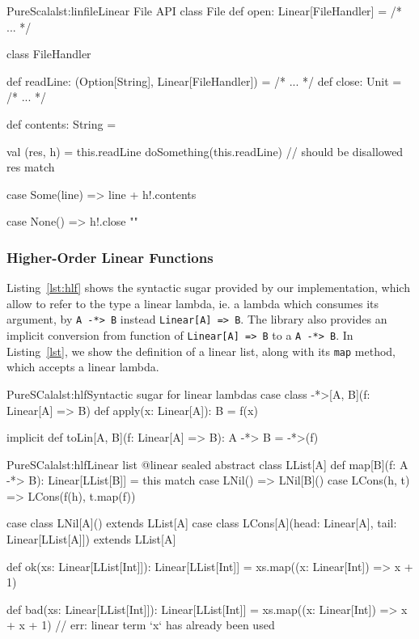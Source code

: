 \documentclass[a4paper,twoside]{article}
\newcommand{\InlineS}[1]{\lstinline[language=PureScala,basicstyle=\small\ttfamily,columns=fixed]|#1|}
\newcommand{\RefCode}[1]{Listing~\ref{#1}}
\newcommand{\stt}[1]{\texttt{\small{#1}}}
\begin{document}
\begin{Code}{PureScala}{lst:linfile}{Linear File API}
class File {
  def open: Linear[FileHandler] = /* ... */
}

class FileHandler {
  def readLine: (Option[String], Linear[FileHandler]) = /* ... */
  def close: Unit = /* ... */
  
  def contents: String = {
    val (res, h) = this.readLine
    doSomething(this.readLine) // should be disallowed
    res match {
      case Some(line) =>
        line + h!.contents

      case None() =>
        h!.close
        ""
    }
  }
}
\end{Code}

\subsubsection{Higher-Order Linear Functions}

\RefCode{lst:hlf} shows the syntactic sugar provided by our implementation, which allow to refer to the type a linear lambda, ie. a lambda which consumes its argument, by \InlineS{A -*> B} instead \InlineS{Linear[A] => B}. The library also provides an implicit conversion from function of \InlineS{Linear[A] => B} to a \InlineS{A -*> B}. In \RefCode{lst}, we show the definition of a linear list, along with its \stt{map} method, which accepts a linear lambda.

\begin{Code}{PureSCala}{lst:hlf}{Syntactic sugar for linear lambdas}
case class -*>[A, B](f: Linear[A] => B) {
  def apply(x: Linear[A]): B = f(x)
}

implicit def toLin[A, B](f: Linear[A] => B): A -*> B = -*>(f)
\end{Code}

\begin{Code}{PureSCala}{lst:hlf}{Linear list}
@linear
sealed abstract class LList[A] {
  def map[B](f: A -*> B): Linear[LList[B]] = this match {
    case LNil()      => LNil[B]()
    case LCons(h, t) => LCons(f(h), t.map(f))
  }
}

case class LNil[A]() extends LList[A]
case class LCons[A](head: Linear[A], tail: Linear[LList[A]]) extends LList[A]

def ok(xs: Linear[LList[Int]]): Linear[LList[Int]] = {
  xs.map((x: Linear[Int]) => x + 1)
}

def bad(xs: Linear[LList[Int]]): Linear[LList[Int]] = {
  xs.map((x: Linear[Int]) => x + x + 1) // err: linear term `x` has already been used
}
\end{Code}
\end{document}
